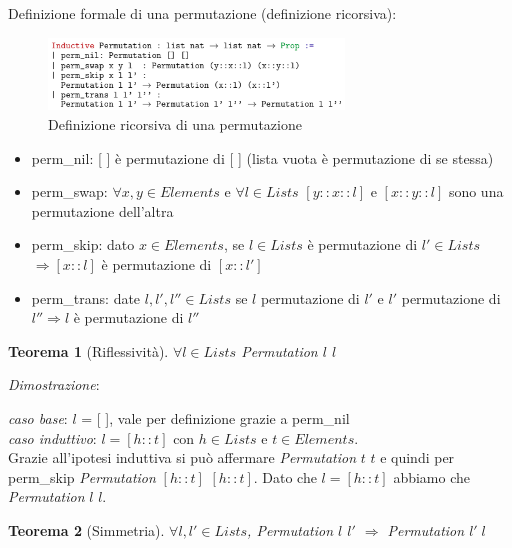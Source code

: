 \documentclass[a4paper]{article}
\newtheorem*{theorem}{Teorema}
\begin{document}
Definizione formale di una permutazione (definizione ricorsiva):
\begin{figure}[!ht]
\centering
\includegraphics[width=0.7\textwidth]{./img/permutazione_ricorsiva.png}
\caption{Definizione ricorsiva di una permutazione} \label{FIG:recursive_permutation1}
\end{figure}
\begin{itemize}
	\item perm\_nil: [ ] è permutazione di [ ] (lista vuota è permutazione di se stessa)
	\item perm\_swap: $\forall x,y \in Elements$ e $\forall l \in Lists$ $[y::x::l]$ e $[x::y::l]$ sono una permutazione dell'altra
	\item perm\_skip: dato $x \in Elements$, se $l \in Lists$ è permutazione di $l' \in Lists$ $\Rightarrow [x::l]$ è permutazione di $[x::l']$
	\item perm\_trans: date $l, l', l'' \in Lists$ se $l$ permutazione di $l'$ e $l'$ permutazione di $l'' \Rightarrow l$ è permutazione di $l''$ 
\end{itemize}
\begin{theorem}[Riflessività] $\forall l \in Lists$ Permutation $l$ $l$\end{theorem}
\textit{Dimostrazione}:
\begin{adjustwidth}{2cm}{}
	\textit{caso base}: $l$ = [ ], vale per definizione grazie a perm\_nil\\
	\textit{caso induttivo}: $l = [h::t]$ con $h \in Lists$ e $t \in Elements$.\\
	Grazie all'ipotesi induttiva si può affermare \textit{Permutation} $t$ $t$ e quindi per perm\_skip \textit{Permutation} $[h::t]$ $[h::t]$. Dato che $l = [h::t]$ abbiamo che \textit{Permutation} $l$ $l$.
\end{adjustwidth}
\begin{theorem}[Simmetria] $\forall l,l' \in Lists$, Permutation $l$ $l'$ $\Rightarrow $ Permutation $l' \; l$\end{theorem}
\end{document}
